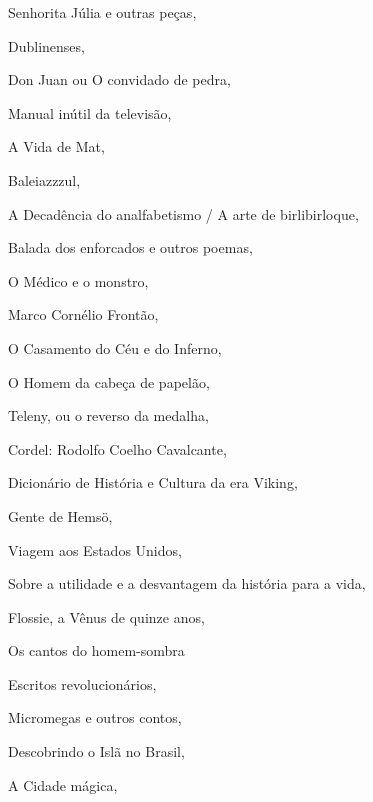 \begin{multicols}{2}
\begin{enumerate}
{\item Senhorita Júlia e outras peças, {}
\item Dublinenses, {}
\item Don Juan ou O convidado de pedra, {}
\item Manual inútil da televisão, {}
\item A Vida de Mat, {}
\item Baleiazzzul, {}
\item A Decadência do analfabetismo / A arte de birlibirloque, {}
\item Balada dos enforcados e outros poemas, {}
\item O Médico e o monstro, {}
\item Marco Cornélio Frontão, {}
\item O Casamento do Céu e do Inferno, {}
\item O Homem da cabeça de papelão, {}
\item Teleny, ou o reverso da medalha, {}
\item Cordel: Rodolfo Coelho Cavalcante, {}
\item Dicionário de História e Cultura da era Viking, {}
\item Gente de Hemsö, {}
\item Viagem aos Estados Unidos, {}
\item Sobre a utilidade e a desvantagem da história para a vida, {}
\item Flossie, a Vênus de quinze anos, {}
\item Os cantos do homem-sombra
\item Escritos revolucionários, {}
\item Micromegas e outros contos, {}
\item Descobrindo o Islã no Brasil, {}
\item A Cidade mágica, {}
}
\end{enumerate}
\end{multicols}
